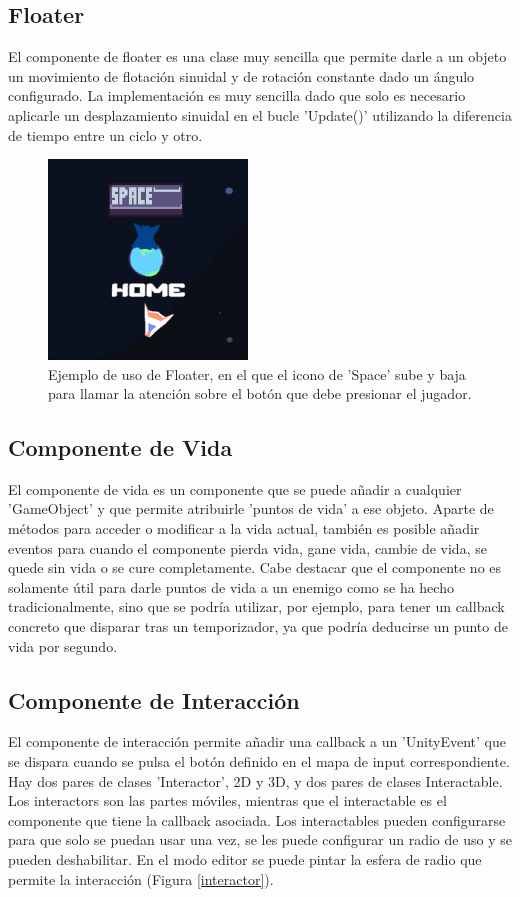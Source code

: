 \subsection{Floater}
El componente de floater es una clase muy sencilla que permite darle a un objeto un movimiento de flotación sinuidal y de rotación constante dado un ángulo configurado. La 
implementación es muy sencilla dado que solo es necesario aplicarle un desplazamiento sinuidal en el bucle 'Update()' utilizando la diferencia de tiempo entre un ciclo y otro.

\begin{figure}[H]
  \centering
    \includegraphics[width=200px,clip=true]{floaterExample.png}
  \caption{Ejemplo de uso de Floater, en el que el icono de 'Space' sube y baja para llamar la atención sobre el botón que debe presionar el jugador.}
  \label{fig:floaterExample}
\end{figure}


\subsection{Componente de Vida}
El componente de vida es un componente que se puede añadir a cualquier 'GameObject' y que permite atribuirle 'puntos de vida' a ese objeto. Aparte de métodos para acceder 
o modificar a la vida actual, también es posible añadir eventos para cuando el componente pierda vida, gane vida, cambie de vida, se quede sin vida o se cure completamente. 
Cabe destacar que el componente no es solamente útil para darle puntos de vida a un enemigo como se ha hecho tradicionalmente, sino que se podría utilizar, por ejemplo, 
para tener un callback concreto que disparar tras un temporizador, ya que podría deducirse un punto de vida por segundo.


\subsection{Componente de Interacción}
El componente de interacción permite añadir una callback a un 'UnityEvent' que se dispara cuando se pulsa el botón definido en el mapa de input correspondiente. 
Hay dos pares de clases 'Interactor', 2D y 3D, y dos pares de clases Interactable. Los interactors son las partes móviles, mientras que el interactable es el componente que 
tiene la callback asociada. Los interactables pueden configurarse para que solo se puedan usar una vez, se les puede configurar un radio de uso y se pueden deshabilitar. 
En el modo editor se puede pintar la esfera de radio que permite la interacción (Figura \ref{interactor}).

